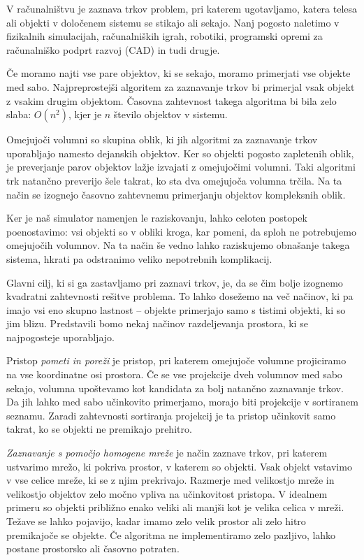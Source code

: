\documentclass[a4paper,12pt]{article}
\begin{document}
V računalništvu je zaznava trkov problem, pri katerem ugotavljamo, katera telesa ali objekti
v določenem sistemu se stikajo ali sekajo. Nanj pogosto naletimo v fizikalnih simulacijah,
računalniških igrah, robotiki, programski opremi za računalniško podprt razvoj (CAD) in tudi drugje.

Če moramo najti vse pare objektov, ki se sekajo, moramo primerjati vse objekte med sabo.
Najpreprostejši algoritem za zaznavanje trkov bi primerjal vsak objekt z vsakim drugim objektom. Časovna
zahtevnost takega algoritma bi bila zelo slaba: $O(n^2)$, kjer je $n$ število objektov v sistemu.

Omejujoči volumni so skupina oblik, ki jih algoritmi za zaznavanje trkov uporabljajo namesto dejanskih objektov.
Ker so objekti pogosto zapletenih oblik, je preverjanje parov objektov lažje izvajati z omejujočimi volumni.
Taki algoritmi trk natančno preverijo šele takrat, ko sta dva omejujoča volumna trčila. Na ta način se izognejo
časovno zahtevnemu primerjanju objektov kompleksnih oblik.

Ker je naš simulator namenjen le raziskovanju, lahko celoten postopek poenostavimo: vsi objekti so v obliki
kroga, kar pomeni, da sploh ne potrebujemo omejujočih volumnov. Na ta način še vedno lahko raziskujemo
obnašanje takega sistema, hkrati pa odstranimo veliko nepotrebnih komplikacij.

Glavni cilj, ki si ga zastavljamo pri zaznavi trkov, je, da se čim bolje izognemo kvadratni zahtevnosti
rešitve problema. To lahko dosežemo na več načinov, ki pa imajo vsi eno skupno lastnost -- objekte 
primerjajo samo s tistimi objekti, ki so jim blizu. Predstavili bomo nekaj načinov razdeljevanja prostora,
ki se najpogosteje uporabljajo.

Pristop \textit{pometi in poreži} je pristop, pri katerem omejujoče volumne projiciramo na vse koordinatne osi prostora. Če se vse projekcije
dveh volumnov med sabo sekajo, volumna upoštevamo kot kandidata za bolj natančno zaznavanje trkov. Da jih lahko med sabo učinkovito
primerjamo, morajo biti projekcije v sortiranem seznamu. Zaradi zahtevnosti sortiranja projekcij je ta pristop
učinkovit samo takrat, ko se objekti ne premikajo prehitro.

\textit{Zaznavanje s pomočjo homogene mreže} je način zaznave trkov, pri katerem ustvarimo mrežo, ki pokriva prostor, v katerem
so objekti. Vsak objekt vstavimo v vse celice mreže, ki se z njim prekrivajo. Razmerje med velikostjo mreže in velikostjo
objektov zelo močno vpliva na učinkovitost pristopa. V idealnem primeru so objekti približno enako veliki ali manjši kot
je velika celica v mreži. Težave se lahko pojavijo, kadar imamo zelo velik prostor ali zelo
hitro premikajoče se objekte. Če algoritma ne implementiramo zelo pazljivo, lahko postane prostorsko ali časovno potraten.
\end{document}
